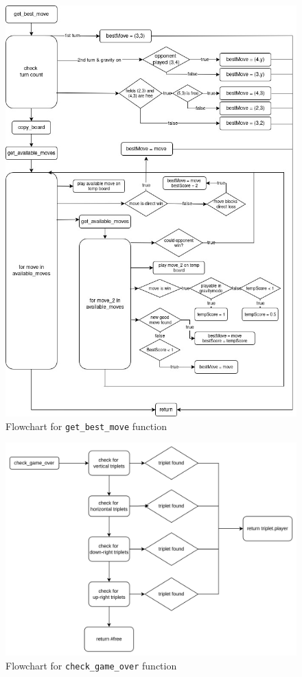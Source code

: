 \documentclass{article}
\begin{document}
        \begin{figure}[htbp]
            \centering
            \includegraphics[width=\textwidth]{../media/get_best_move.jpeg}
            \caption{Flowchart for \texttt{get\_best\_move} function}\label{fig:get_best_move}
        \end{figure}

        \begin{figure}[htbp]
            \centering
            \includegraphics[width=\textwidth]{../media/check_game_over.png}
            \caption{Flowchart for \texttt{check\_game\_over} function}\label{fig:check_game_over}
        \end{figure}
\end{document}
